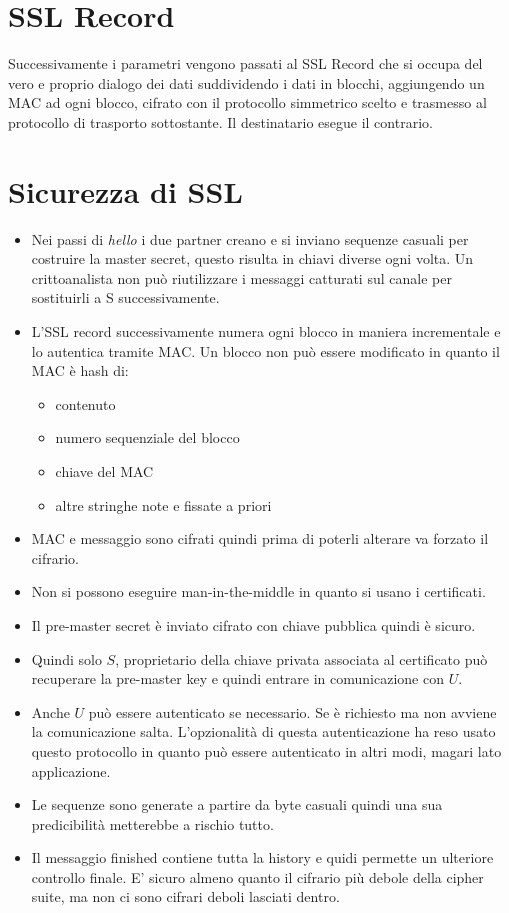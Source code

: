 \section{SSL Record}
Successivamente i parametri vengono passati al SSL Record che si occupa del vero e proprio dialogo dei dati suddividendo i dati in blocchi, aggiungendo un MAC ad ogni blocco, cifrato con il protocollo simmetrico scelto e trasmesso al protocollo di trasporto sottostante. Il destinatario esegue il contrario.


\section{Sicurezza di SSL}
\begin{itemize}
	\item Nei passi di \textit{hello} i due partner creano e si inviano sequenze casuali per costruire la master secret, questo risulta in chiavi diverse ogni volta. Un crittoanalista non può riutilizzare i messaggi catturati sul canale per sostituirli a S successivamente.
	\item L'SSL record successivamente numera ogni blocco in maniera incrementale e lo autentica tramite MAC.
	Un blocco non può essere modificato in quanto il MAC è hash di:
	\begin{itemize}
		\item contenuto
		\item numero sequenziale del blocco
		\item chiave del MAC
		\item altre stringhe note e fissate a priori
	\end{itemize}
\item MAC e messaggio sono cifrati quindi prima di poterli alterare va forzato il cifrario.

\item Non si possono eseguire man-in-the-middle in quanto si usano i certificati.

\item Il pre-master secret è inviato cifrato con chiave pubblica quindi è sicuro.

\item Quindi solo $S$, proprietario della chiave privata associata al certificato può recuperare la pre-master key e quindi entrare in comunicazione con $U$.

\item Anche $U$ può essere autenticato se necessario.
Se è richiesto ma non avviene la comunicazione salta.
L'opzionalità di questa autenticazione ha reso usato questo protocollo in quanto può essere autenticato in altri modi, magari lato applicazione.

\item Le sequenze sono generate a partire da byte casuali quindi una sua predicibilità metterebbe a rischio tutto.

\item Il messaggio finished contiene tutta la history e quidi permette un ulteriore controllo finale. E' sicuro almeno quanto il cifrario più debole della cipher suite, ma non ci sono cifrari deboli lasciati dentro.
\end{itemize}






